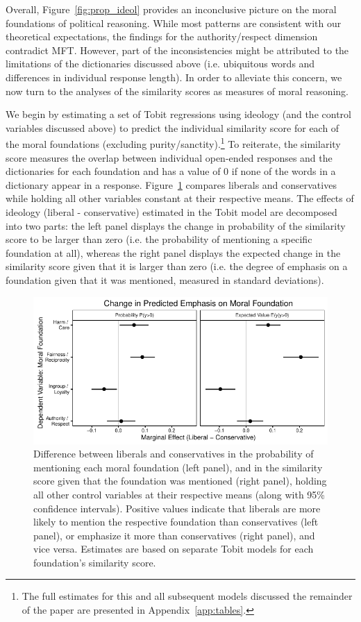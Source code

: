 \documentclass[12pt]{article}
\begin{document}
Overall, Figure~\ref{fig:prop_ideol} provides an inconclusive picture on the moral foundations of political reasoning. While most patterns are consistent with our theoretical expectations, the findings for the authority/respect dimension contradict MFT. However, part of the inconsistencies might be attributed to the limitations of the dictionaries discussed above (i.e. ubiquitous words and differences in individual response length). In order to alleviate this concern, we now turn to the analyses of the similarity scores as measures of moral reasoning.

We begin by estimating a set of Tobit regressions using ideology (and the control variables discussed above) to predict the individual similarity score for each of the moral foundations (excluding purity/sanctity).\footnote{The full estimates for this and all subsequent models discussed the remainder of the paper are presented in Appendix~\ref{app:tables}.} To reiterate, the similarity score measures the overlap between individual open-ended responses and the dictionaries for each foundation and has a value of 0 if none of the words in a dictionary appear in a response. Figure~\ref{fig:tobit_ideol} compares liberals and conservatives while holding all other variables constant at their respective means. The effects of ideology (liberal - conservative) estimated in the Tobit model are decomposed into two parts: the left panel displays the change in probability of the similarity score to be larger than zero (i.e. the probability of mentioning a specific foundation at all), whereas the right panel displays the expected change in the similarity score given that it is larger than zero (i.e. the degree of emphasis on a foundation given that it was mentioned, measured in standard deviations).

\begin{figure}[ht]\centering
\includegraphics{../calc/fig/tobit_ideol.pdf}
\caption{Difference between liberals and conservatives in the probability of mentioning each moral foundation (left panel), and in the similarity score given that the foundation was mentioned (right panel), holding all other control variables at their respective means (along with 95\% confidence intervals). Positive values indicate that liberals are more likely to mention the respective foundation than conservatives (left panel), or emphasize it more than conservatives (right panel), and vice versa. Estimates are based on separate Tobit models for each foundation's similarity score. %
}\label{fig:tobit_ideol}
\end{figure}
\end{document}

